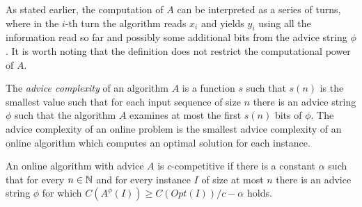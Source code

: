 As stated earlier, the computation of $A$ can be interpreted as a series
of turns, where in the $i$-th turn the algorithm reads $x_i$ and yields
$y_i$ using all the information read so far and possibly some additional
bits from the advice string $\phi$. It is worth noting that the definition
does not restrict the computational power of $A$.

\begin{definition}\label{def:advice-complexity}
    The \emph{advice complexity} of an algorithm $A$ is a function $s$
    such that $s(n)$ is the smallest value such that for each input
    sequence of size $n$ there is an advice string $\phi$ such that the
    algorithm $A$ examines at most the first $s(n)$ bits of $\phi$. The
    advice complexity of an online problem is the smallest advice
    complexity of an online algorithm which computes an optimal solution
    for each instance.
\end{definition}

\begin{definition}\label{def:advice-competitive}
    An online algorithm with advice $A$ is $c$-competitive if there is a
    constant $\alpha$ such that for every $n \in \mathbb{N}$ and for every
    instance $I$ of size at most $n$ there is an advice string $\phi$ for
    which $C(A^\phi(I)) \geq C(Opt(I)) / c - \alpha$ holds.
\end{definition}
